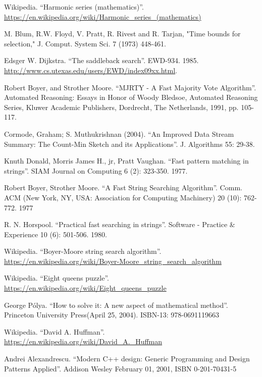 \begin{thebibliography}{99}
Wikipedia. ``Harmonic series (mathematics)''. \url{https://en.wikipedia.org/wiki/Harmonic_series_(mathematics)}


M. Blum, R.W. Floyd, V. Pratt, R. Rivest and R. Tarjan, "Time bounds for selection," J. Comput. System Sci. 7 (1973) 448-461.

Edsger W. Dijkstra. ``The saddleback search''. EWD-934. 1985. \url{http://www.cs.utexas.edu/users/EWD/index09xx.html}.

Robert Boyer, and Strother Moore. ``MJRTY - A Fast Majority Vote Algorithm''. Automated Reasoning: Essays in Honor of Woody Bledsoe, Automated Reasoning Series, Kluwer Academic Publishers, Dordrecht, The Netherlands, 1991, pp. 105-117.

Cormode, Graham; S. Muthukrishnan (2004). ``An Improved Data Stream Summary: The Count-Min Sketch and its Applications''. J. Algorithms 55: 29-38.

Knuth Donald, Morris James H., jr, Pratt Vaughan. ``Fast pattern matching in strings''. SIAM Journal on Computing 6 (2): 323-350. 1977.

Robert Boyer, Strother Moore. ``A Fast String Searching Algorithm''. Comm. ACM (New York, NY, USA: Association for Computing Machinery) 20 (10): 762-772. 1977

R. N. Horspool. ``Practical fast searching in strings''. Software - Practice \& Experience 10 (6): 501-506. 1980.

Wikipedia. ``Boyer-Moore string search algorithm''. \url{https://en.wikipedia.org/wiki/Boyer-Moore_string_search_algorithm}

Wikipedia. ``Eight queens puzzle''. \url{https://en.wikipedia.org/wiki/Eight_queens_puzzle}

George P\'{o}lya. ``How to solve it: A new aspect of mathematical method''. Princeton University Press(April 25, 2004). ISBN-13: 978-0691119663

Wikipedia. ``David A. Huffman''. \url{https://en.wikipedia.org/wiki/David_A._Huffman}


Andrei Alexandrescu. ``Modern C++ design: Generic Programming and Design Patterns Applied''. Addison Wesley February 01, 2001, ISBN 0-201-70431-5


\end{thebibliography}
